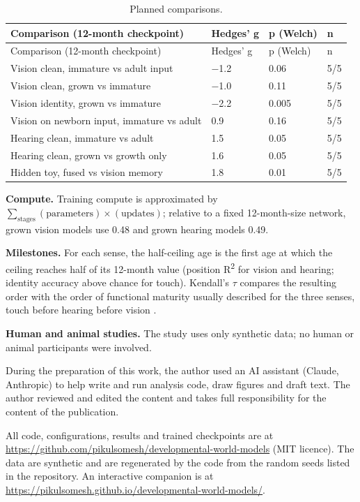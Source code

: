 \documentclass{article}
\begin{document}
\begin{longtable}[]{@{}llll@{}}
\caption{Planned comparisons.}\tabularnewline
\toprule\noalign{}
Comparison (12-month checkpoint) & Hedges' g & p (Welch) & n \\
\midrule\noalign{}
\endfirsthead
\toprule\noalign{}
Comparison (12-month checkpoint) & Hedges' g & p (Welch) & n \\
\midrule\noalign{}
\endhead
\bottomrule\noalign{}
\endlastfoot
Vision clean, immature vs adult input & \ensuremath{-}1.2 & 0.06 & 5/5 \\
Vision clean, grown vs immature & \ensuremath{-}1.0 & 0.11 & 5/5 \\
Vision identity, grown vs immature & \ensuremath{-}2.2 & 0.005 & 5/5 \\
Vision on newborn input, immature vs adult & 0.9 & 0.16 & 5/5 \\
Hearing clean, immature vs adult & 1.5 & 0.05 & 5/5 \\
Hearing clean, grown vs growth only & 1.6 & 0.05 & 5/5 \\
Hidden toy, fused vs vision memory & 1.8 & 0.01 & 5/5 \\
\end{longtable}

\textbf{Compute.} Training compute is approximated by \(\sum_{\text{stages}}(\text{parameters})\times(\text{updates})\); relative to a fixed 12-month-size network, grown vision models use 0.48 and grown hearing models 0.49.

\textbf{Milestones.} For each sense, the half-ceiling age is the first age at which the ceiling reaches half of its 12-month value (position R\textsuperscript{2} for vision and hearing; identity accuracy above chance for touch). Kendall's \ensuremath{\tau} compares the resulting order with the order of functional maturity usually described for the three senses, touch before hearing before vision \autocite{turkewitz1982limitations}.

\textbf{Human and animal studies.} The study uses only synthetic data; no human or animal participants were involved.


\clearpage
During the preparation of this work, the author used an AI assistant (Claude, Anthropic) to help write and run analysis code, draw figures and draft text. The author reviewed and edited the content and takes full responsibility for the content of the publication.

All code, configurations, results and trained checkpoints are at \url{https://github.com/pikulsomesh/developmental-world-models} (MIT licence). The data are synthetic and are regenerated by the code from the random seeds listed in the repository. An interactive companion is at \url{https://pikulsomesh.github.io/developmental-world-models/}.
\end{document}
